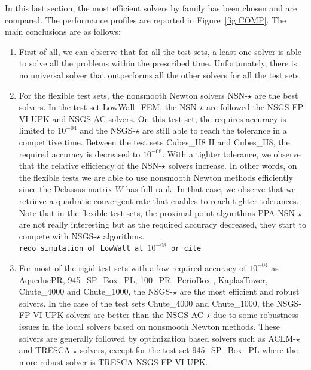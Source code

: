 In this last section, the most efficient solvers by family has been chosen and are compared. The performance profiles are reported in Figure~\ref{fig:COMP}. The main conclusions are as follows:
\begin{enumerate}
\item First of all, we can observe that for all the test sets, a least one solver is able to solve all the problems within the prescribed time.  Unfortunately, there is no universal solver that outperforms all the other solvers for all the test sets.
\item For the flexible test sets, the nonsmooth Newton solvers {\sf NSN-$\star$} are the best solvers. In the test set LowWall\_FEM, the {\sf NSN-$\star$} are followed the {\sf NSGS-FP-VI-UPK} and {\sf NSGS-AC} solvers. On this test set, the requires accuracy is limited to $10^{-04}$ and the  {\sf NSGS-$\star$} are still able to reach the tolerance in a competitive time. Between the test sets {\sf Cubes\_H8 II} and {\sf Cubes\_H8}, the required accuracy is decreased to $10^{-08}$. With a tighter tolerance, we observe that the relative efficiency of the {\sf NSN-$\star$} solvers increase. In other words, on the flexible tests we are able to use nonsmooth Newton methods efficiently since the Delassus matrix $W$ has full rank. In that case, we observe that we retrieve a quadratic convergent rate that enables to reach tighter tolerances. Note that in the flexible test sets, the proximal point algorithms {\sf PPA-NSN-$\star$} are not really interesting but as the required accuracy decreased, they start to compete with {\sf NSGS-$\star$} algorithms.\\
  {\tt redo simulation of LowWall at $10^{-08}$ or cite \citep{Acary.ea_CSMA2017}}
\item For most of the rigid test sets with a low required accuracy of $10^{-04}$ as AqueducPR, 945\_SP\_Box\_PL, 100\_PR\_PerioBox , KaplasTower, Chute\_4000 and Chute\_1000,   the {\sf NSGS-$\star$} are the most efficient and robust solvers. In the case of the test sets Chute\_4000 and Chute\_1000,  the {\sf NSGS-FP-VI-UPK} solvers are better than the {\sf NSGS-AC-$\star$} due to some robustness issues in the local solvers based on nonsmooth Newton methods. These solvers are generally followed by optimization based solvers such as {\sf ACLM-$\star$} and {\sf TRESCA-$\star$} solvers, except for the test set 945\_SP\_Box\_PL where the more robust solver is {\sf TRESCA-NSGS-FP-VI-UPK}.
  

\end{enumerate}

